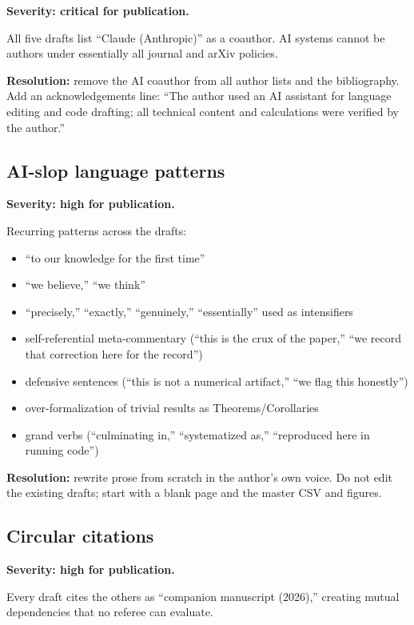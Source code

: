 \documentclass[11pt]{report}
\theoremstyle{definition}
\theoremstyle{remark}
\begin{document}
\textbf{Severity: critical for publication.}

All five drafts list ``Claude (Anthropic)'' as a coauthor. AI systems
cannot be authors under essentially all journal and arXiv policies.

\textbf{Resolution:} remove the AI coauthor from all author lists and the
bibliography. Add an acknowledgements line: ``The author used an AI
assistant for language editing and code drafting; all technical content
and calculations were verified by the author.''

\subsection{AI-slop language patterns}

\textbf{Severity: high for publication.}

Recurring patterns across the drafts:
\begin{itemize}
  \item ``to our knowledge for the first time''
  \item ``we believe,'' ``we think''
  \item ``precisely,'' ``exactly,'' ``genuinely,'' ``essentially'' used
        as intensifiers
  \item self-referential meta-commentary (``this is the crux of the
        paper,'' ``we record that correction here for the record'')
  \item defensive sentences (``this is not a numerical artifact,''
        ``we flag this honestly'')
  \item over-formalization of trivial results as Theorems/Corollaries
  \item grand verbs (``culminating in,'' ``systematized as,'' ``reproduced
        here in running code'')
\end{itemize}

\textbf{Resolution:} rewrite prose from scratch in the author's own voice.
Do not edit the existing drafts; start with a blank page and the master
CSV and figures.

\subsection{Circular citations}

\textbf{Severity: high for publication.}

Every draft cites the others as ``companion manuscript (2026),'' creating
mutual dependencies that no referee can evaluate.
\end{document}
